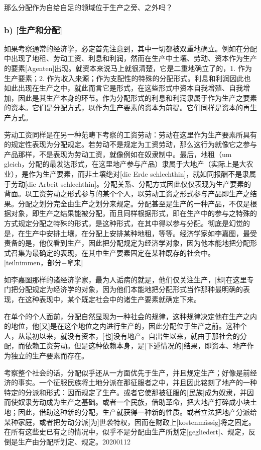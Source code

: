 \documentclass[a5paper,twoside,10.5pt]{ctexart}
\begin{document}
那么分配作为自给自足的领域位于生产之旁、之外吗？

\subsubsection{b) [生产和分配]}
如果考察通常的经济学，必定首先注意到，其中一切都被双重地确立。例如在分配中出现了地租、劳动工资、利息和利润，然而在生产中土壤、劳动、资本作为生产的要素[Agenten]出现。就资本来说马上就很清楚，它是二重地确立了的，1. 作为生产要素；2. 作为收入来源；作为支配性的特殊的分配形式。利息和利润因此也如此出现在生产之中，就此而言它是形式，在这些形式中资本自我增殖、自我增加，因此是其生产本身的环节。作为分配形式的利息和利润隶属于作为生产之要素的资本。它们是分配方式，以作为生产要素的资本为前提。它们同样是资本的再生产方式。

劳动工资同样是在另一种范畴下考察的工资劳动：劳动在这里作为生产要素所具有的规定性表现为分配规定。若劳动不是规定为工资劳动，那么这行为就像它之参与产品那样，不是表现为劳动工资，就像例如在奴隶制中。最后，地租（um gleich，分配的最发达形式，在这里地产参与产品）隶属于大地产（实际上是大农业），是作为生产要素，而非土壤绝对[die Erde schlechthin]，就如同报酬不是隶属于劳动[die Arbeit schlechthin]。分配关系、分配方式因此仅仅表现为生产要素的背面。以工资劳动之形式参与的某个个人，以劳动工资之形式参与产品即生产之结果。分配之划分完全由生产之划分来规定。分配甚至是生产的一种产品，不仅是根据对象，即生产之结果能被分配，而且同样根据形式，即在生产中的参与之特殊的方式规定分配之特殊的形式，是这种形式，在其中得以参与分配。彻底是幻觉的是，在生产中安排土壤，在分配上安排某种地租，等等。经济学家如李嘉图，最受责备的是，他仅看到生产，因此把分配规定为经济学对象，因为他本能地把分配形式召集为最确定的表现，在其中生产要素固定在某种既存的社会中。[teilnimmen，部分+拿来]

如李嘉图那样的诸经济学家，最为人诟病的就是，他们仅关注生产，[却]在这里专门把分配规定为经济学的对象，因为他们本能地把分配形式当作那种最明确的表现，在这种表现中，某个既定社会中的诸生产要素就确定下来。

在单个的个人面前，分配自然显现为一种社会的规律，这种规律决定他在生产之内的地位，他[又]是在这个地位之内进行生产的，因此分配位于生产之前。这种个人，从最初以来，就没有资本，[也]没有地产。自出生以来，就由于那社会的分配，而依赖工资劳动。但是这种依赖本身，是[下述情况的]结果，即资本、地产作为独立的生产要素而存在。

考察整个社会的话，分配似乎还从一方面优先于生产，并且规定生产；好像是前经济的事实。一个征服民族将土地分派在那征服者之中，并且因此铭刻了地产的一种特定的分派和形式：因而规定了生产。或者它使那被征服的[民族]成为奴隶，并因而使奴隶劳动成为生产之基础。或者一个民族，借助革命，把大地产打碎成小块土地；因此，借助这种新的分配，生产就获得一种新的性质。或者立法把地产分派给某种家庭，或者把劳动分派[为]世袭特权，因而在财政上[kostenmässig]将之固定。在所有这些史已有之的情况中，似乎不是分配由生产所划定[gegliedert]、规定，反倒是生产由分配所划定、规定。20200112
\end{document}
